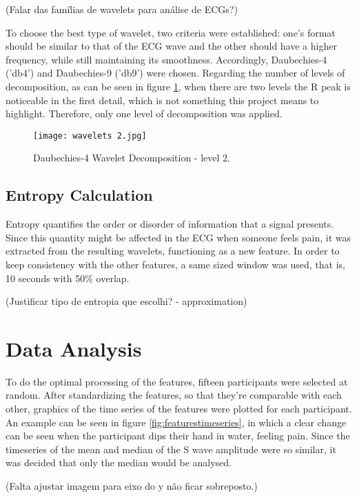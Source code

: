 (Falar das famílias de wavelets para análise de ECGs?)

To choose the best type of wavelet, two criteria were established: one's format should be similar to that of the ECG wave and the other should have a higher frequency, while still maintaining its smoothness.
Accordingly, Daubechies-4 ('db4') and Daubechies-9 ('db9') were chosen.
Regarding the number of levels of decomposition, as can be seen in figure \ref{fig:wavelets2}, when there are two levels the R peak is noticeable in the first detail, which is not something this project means to highlight.
Therefore, only one level of decomposition was applied.

\begin{figure}[h!]
    \centering
    \texttt{[image: wavelets 2.jpg]}
    \caption{Daubechies-4 Wavelet Decomposition - level 2.}
    \label{fig:wavelets2}
\end{figure}


\subsection{Entropy Calculation}
Entropy quantifies the order or disorder of information that a signal presents. Since this quantity might be affected in the ECG when someone feels pain, it was extracted from the resulting wavelets, functioning as a new feature. In order to keep consistency with the other features, a same sized window was used, that is, 10 seconds with 50\% overlap. 

(Justificar tipo de entropia que escolhi? - approximation)




\section{Data Analysis}
To do the optimal processing of the features, fifteen participants were selected at random. After standardizing the features, so that they're comparable with each other, graphics of the time series of the features were plotted for each participant. An example can be seen in figure \ref{fig:featurestimeseries}, in which a clear change can be seen when the participant dips their hand in water, feeling pain. Since the timeseries of the mean and median of the S wave amplitude were so similar, it was decided that only the median would be analysed.

(Falta ajustar imagem para eixo do y não ficar sobreposto.)


